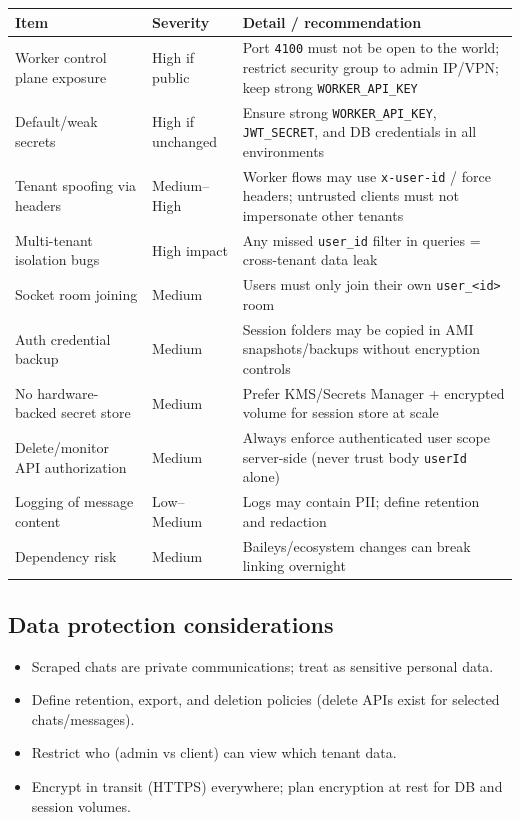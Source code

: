\documentclass[11pt,a4paper]{article}
\begin{document}
\begin{tabularx}{\textwidth}{L{4.2cm} L{2.8cm} X}
\toprule
\textbf{Item} & \textbf{Severity} & \textbf{Detail / recommendation} \\
\midrule
Worker control plane exposure & High if public & Port \texttt{4100} must not be open to the world; restrict security group to admin IP/VPN; keep strong \texttt{WORKER\_API\_KEY} \\
Default/weak secrets & High if unchanged & Ensure strong \texttt{WORKER\_API\_KEY}, \texttt{JWT\_SECRET}, and DB credentials in all environments \\
Tenant spoofing via headers & Medium--High & Worker flows may use \texttt{x-user-id} / force headers; untrusted clients must not impersonate other tenants \\
Multi-tenant isolation bugs & High impact & Any missed \texttt{user\_id} filter in queries = cross-tenant data leak \\
Socket room joining & Medium & Users must only join their own \texttt{user\_<id>} room \\
Auth credential backup & Medium & Session folders may be copied in AMI snapshots/backups without encryption controls \\
No hardware-backed secret store & Medium & Prefer KMS/Secrets Manager + encrypted volume for session store at scale \\
Delete/monitor API authorization & Medium & Always enforce authenticated user scope server-side (never trust body \texttt{userId} alone) \\
Logging of message content & Low--Medium & Logs may contain PII; define retention and redaction \\
Dependency risk & Medium & Baileys/ecosystem changes can break linking overnight \\
\bottomrule
\end{tabularx}

\subsection{Data protection considerations}

\begin{itemize}[leftmargin=1.2em]
  \item Scraped chats are private communications; treat as sensitive personal data.
  \item Define retention, export, and deletion policies (delete APIs exist for selected chats/messages).
  \item Restrict who (admin vs client) can view which tenant data.
  \item Encrypt in transit (HTTPS) everywhere; plan encryption at rest for DB and session volumes.
\end{itemize}
\end{document}
